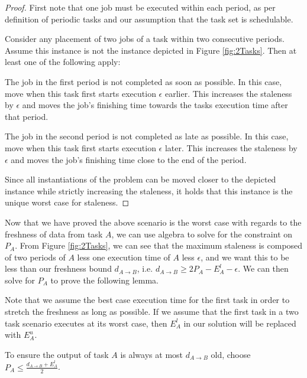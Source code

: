 \begin{proof}
	First note that one job must be executed within each period, as per definition of periodic tasks and our assumption that the task set is schedulable.
	
	Consider any placement of two jobs of a task within two consecutive periods. Assume this instance is not the instance depicted in Figure \ref{fig:2Tasks}. Then at least one of the following apply:
	\begin{case}
		The job in the first period is not completed as soon as possible. In this case, move when this task first starts execution $\epsilon$ earlier. This increases the staleness by $\epsilon$ and moves the job's finishing time towards the tasks execution time after that period.
	\end{case}
	\begin{case}
		The job in the second period is not completed as late as possible. In this case, move when this task first starts execution $\epsilon$ later. This increases the staleness by $\epsilon$ and moves the job's finishing time close to the end of the period.
	\end{case}
	Since all instantiations of the problem can be moved closer to the depicted instance while strictly increasing the staleness, it holds that this instance is the unique worst case for staleness.
\end{proof}

Now that we have proved the above scenario is the worst case with regards to the freshness of data from task $A$, we can use algebra to solve for the constraint on $P_A$. From Figure \ref{fig:2Tasks}, we can see that the maximum staleness is composed of two periods of $A$ less one execution time of $A$ less $\epsilon$, and we want this to be less than our freshness bound $d_{A \to B}$, i.e. $d_{A \to B} \geq 2P_A-E^l_A-\epsilon$. We can then solve for $P_A$ to prove the following lemma.

Note that we assume the best case execution time for the first task in order to stretch the freshness as long as possible. If we assume that the first task in a two task scenario executes at its worst case, then $E^l_A$ in our solution will be replaced with $E^u_A$.

\begin{lemma}
	\label{lem:2TaskResult}
	To ensure the output of task $A$ is always at most $d_{A \to B}$ old, choose $P_A \leq \frac{d_{A \to B} + E^l_A}{2}$.
\end{lemma}


